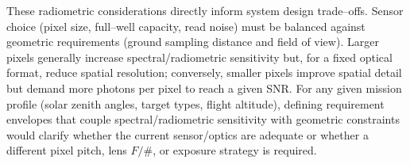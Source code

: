 \noindent
These radiometric considerations directly inform system design trade–offs. Sensor choice (pixel size, full–well capacity, read noise) must be balanced against geometric requirements (ground sampling distance and field of view). Larger pixels generally increase spectral/radiometric sensitivity but, for a fixed optical format, reduce spatial resolution; conversely, smaller pixels improve spatial detail but demand more photons per pixel to reach a given SNR. For any given mission profile (solar zenith angles, target types, flight altitude), defining requirement envelopes that couple spectral/radiometric sensitivity with geometric constraints would clarify whether the current sensor/optics are adequate or whether a different pixel pitch, lens $F/\#$, or exposure strategy is required.\\

